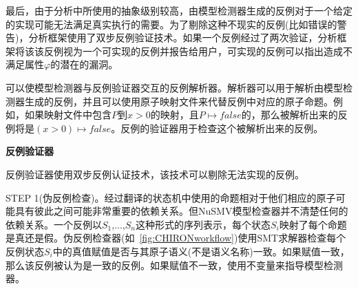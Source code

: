 最后，由于分析中所使用的抽象级别较高，由模型检测器生成的反例对于一个给定的实现可能无法满足真实执行的需要。为了剔除这种不现实的反例(比如错误的警告)，分析框架使用了双步反例验证技术。如果一个反例经过了两次验证，分析框架将该该反例视为一个可实现的反例并报告给用户，可实现的反例可以指出造成不满足属性$\varphi$的潜在的漏洞。

可以使模型检测器与反例验证器交互的反例解析器。解析器可以用于解析由模型检测器生成的反例，并且可以使用原子映射文件来代替反例中对应的原子命题。例如，如果映射文件中包含$P$到${x > 0}$的映射，且$P\mapsto false$的，那么被解析出来的反例将是$(x > 0) \mapsto false$。反例的验证器用于检查这个被解析出来的反例。





\textbf{反例验证器}

反例验证器使用双步反例认证技术，该技术可以剔除无法实现的反例。

STEP 1(伪反例检查)。经过翻译的状态机中使用的命题相对于他们相应的原子可能具有彼此之间可能非常重要的依赖关系。但NuSMV模型检查器并不清楚任何的依赖关系。一个反例以$S_1$,...,$S_n$这种形式的序列表示，每个状态$S_i$映射了每个命题是真还是假。伪反例检查器(如~\ref{fig:CHIRONworkflow})使用SMT求解器检查每个反例状态$S_i$中的真值赋值是否与其原子语义(不是语义名称)一致。如果赋值一致，那么该反例被认为是一致的反例。如果赋值不一致，使用不变量来指导模型检测器。

